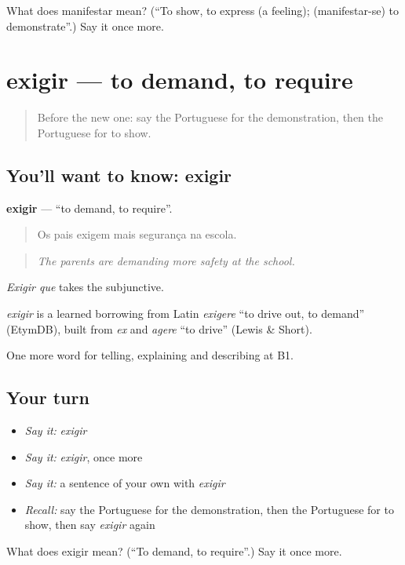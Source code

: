 \begin{tcolorbox}[breakable,colback=teal!4,colframe=teal!35!black,title={Before you move on}]
What does manifestar mean? (\textquotedblleft{}To show, to express (a feeling); (manifestar-se) to demonstrate\textquotedblright{}.) Say it once more.
\end{tcolorbox}
\section[exigir]{exigir — to demand, to require}

\label{lesson:PT-C364-exigir}



\begin{quote}
Before the new one: say the Portuguese for the demonstration, then the Portuguese for to show.
\end{quote}

\subsection*{You'll want to know: exigir}
\textbf{exigir} — \textquotedblleft{}to demand, to require\textquotedblright{}.

\begin{quote}
Os pais exigem mais segurança na escola.
\end{quote}

\begin{quote}
\emph{The parents are demanding more safety at the school.}
\end{quote}

\emph{Exigir que} takes the subjunctive.

\begin{cousinweb}
\emph{exigir} is a learned borrowing from Latin \emph{exigere} \textquotedblleft{}to drive out, to demand\textquotedblright{} (EtymDB), built from \emph{ex} and \emph{agere} \textquotedblleft{}to drive\textquotedblright{} (Lewis \& Short).
\end{cousinweb}

\begin{grammarlens}[title={What you've built}]
One more word for telling, explaining and describing at B1.
\end{grammarlens}

\subsection*{Your turn}
\begin{itemize}
\raggedright
  \item \emph{Say it:} \emph{exigir}
  \item \emph{Say it:} \emph{exigir}, once more
  \item \emph{Say it:} a sentence of your own with \emph{exigir}
  \item \emph{Recall:} say the Portuguese for the demonstration, then the Portuguese for to show, then say \emph{exigir} again
\end{itemize}

\begin{tcolorbox}[breakable,colback=teal!4,colframe=teal!35!black,title={Before you move on}]
What does exigir mean? (\textquotedblleft{}To demand, to require\textquotedblright{}.) Say it once more.
\end{tcolorbox}

